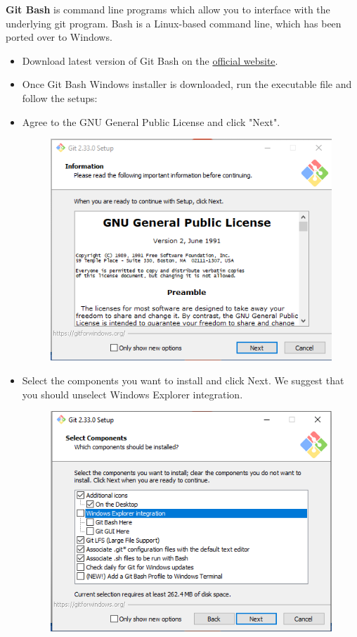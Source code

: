 \documentclass[10pt]{article} %
\begin{document}
\textbf{Git Bash} is command line programs which allow you to interface with the underlying git program.
Bash is a Linux-based command line, which has been ported over to Windows.
\begin{itemize}
  \item  Download latest version of Git Bash on the \href{http://gitforwindows.org/}{official website}.
  \item Once Git Bash Windows installer is downloaded, run the executable file and follow the setups:
  \item Agree to the GNU General Public License and click "Next".
  \begin{figure}[h!]
    \centering
    \includegraphics[width=0.58\linewidth]{figs/GitBash1}
    \caption{}
    \label{fig:gitbash1}
  \end{figure}

  \item Select the components you want to install and click Next.
  We suggest that you should unselect Windows Explorer integration.

  \begin{figure}[h!]
    \centering
    \includegraphics[width=0.55\linewidth]{figs/git2}
    \caption{}
    \label{fig:gitbash3}
  \end{figure}

  \pagebreak


\end{itemize}
\end{document}
